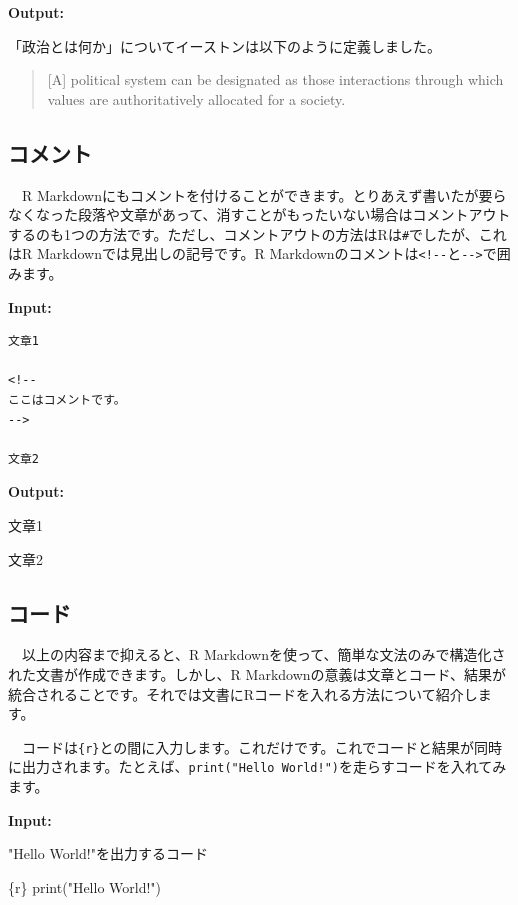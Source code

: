 \documentclass[
  a4paper,
  pandoc,
  ja=standard,
  jafont=haranoaji]{bxjsbook}
\newenvironment{Shaded}{\begin{snugshade}}{\end{snugshade}}
\newcommand{\FunctionTok}[1]{\textcolor[rgb]{0.28,0.35,0.67}{#1}}
\newcommand{\InformationTok}[1]{\textcolor[rgb]{0.37,0.37,0.37}{#1}}
\newcommand{\NormalTok}[1]{\textcolor[rgb]{0.00,0.48,0.65}{#1}}
\newcommand{\StringTok}[1]{\textcolor[rgb]{0.13,0.47,0.30}{#1}}
\begin{document}
\textbf{Output:}

「政治とは何か」についてイーストンは以下のように定義しました。

\begin{quote}
{[}A{]} political system can be designated as those interactions through
which values are authoritatively allocated for a society.
\end{quote}

\hypertarget{ux30b3ux30e1ux30f3ux30c8}{%
\subsection{コメント}\label{ux30b3ux30e1ux30f3ux30c8}}

　R
Markdownにもコメントを付けることができます。とりあえず書いたが要らなくなった段落や文章があって、消すことがもったいない場合はコメントアウトするのも1つの方法です。ただし、コメントアウトの方法はRは\texttt{\#}でしたが、これはR
Markdownでは見出しの記号です。R
Markdownのコメントは\texttt{\textless{}!-\/-}と\texttt{-\/-\textgreater{}}で囲みます。

\textbf{Input:}

\begin{verbatim}
文章1

<!--
ここはコメントです。
-->

文章2
\end{verbatim}

\textbf{Output:}

文章1

文章2

\hypertarget{ux30b3ux30fcux30c9}{%
\subsection{コード}\label{ux30b3ux30fcux30c9}}

　以上の内容まで抑えると、R
Markdownを使って、簡単な文法のみで構造化された文書が作成できます。しかし、R
Markdownの意義は文章とコード、結果が統合されることです。それでは文書にRコードを入れる方法について紹介します。

　コードは\texttt{\textasciigrave{}\textasciigrave{}\textasciigrave{}\{r\}}と\texttt{\textasciigrave{}\textasciigrave{}\textasciigrave{}}の間に入力します。これだけです。これでコードと結果が同時に出力されます。たとえば、\texttt{print("Hello\ World!")}を走らすコードを入れてみます。

\textbf{Input:}

\begin{Shaded}
\begin{Highlighting}[]
\NormalTok{"Hello World!"を出力するコード}

\InformationTok{\textasciigrave{}\textasciigrave{}\textasciigrave{}\{r\}}
\FunctionTok{print}\NormalTok{(}\StringTok{"Hello World!"}\NormalTok{)}
\InformationTok{\textasciigrave{}\textasciigrave{}\textasciigrave{}}
\end{Highlighting}
\end{Shaded}
\end{document}
